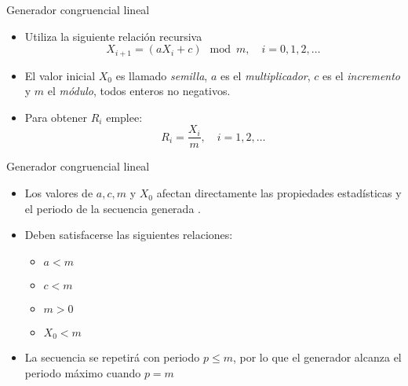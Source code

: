 \begin{frame}{Generador congruencial lineal}
        \begin{itemize}
        \item Utiliza la siguiente relación recursiva \begin{equation*}
            X_{i+1}=\left(aX_i+c\right)\mod m, \quad i=0,1,2,\dots
        \end{equation*}
        \item El valor inicial $X_0$ es llamado \textit{semilla}, $a$ es el \textit{multiplicador}, $c$ es el \textit{incremento} y $m$ el \textit{módulo}, todos enteros no negativos.
        \item Para obtener $R_i$ emplee:
        \begin{equation*}R_i=\frac{X_i}{m}, \quad i=1,2,\dots\end{equation*}
    \end{itemize}
\end{frame}

\begin{frame}{Generador congruencial lineal}
    
    \begin{itemize}
        \item Los valores de $a, c, m$ y $X_0$ afectan directamente las propiedades estadísticas y el periodo de la secuencia generada \cite{BCN}.
        \item Deben satisfacerse las siguientes relaciones:
        \begin{itemize}
            \item $a < m$
            \item $c < m$
            \item $m > 0$
            \item $X_0 < m$
        \end{itemize}
        \item La secuencia se repetirá con periodo $p\leq m$, por lo que el generador alcanza el periodo máximo cuando $p=m$
    \end{itemize}
\end{frame}


